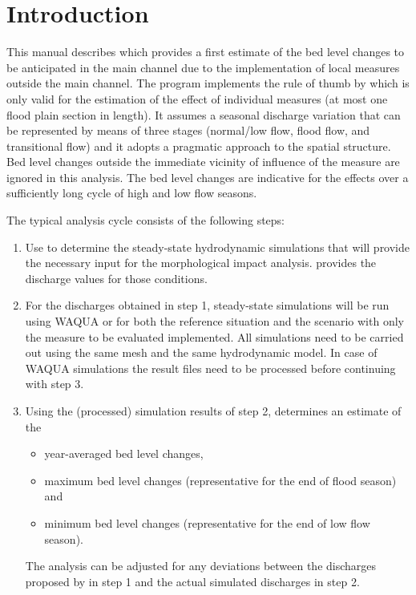 \chapter{Introduction}

This manual describes \dfastmi which provides a first estimate of the bed level changes to be anticipated in the main channel due to the implementation of local measures outside the main channel.
The program implements the rule of thumb by \citep{Sieben2008} which is only valid for the estimation of the effect of individual measures (at most one flood plain section in length).
It assumes a seasonal discharge variation that can be represented by means of three stages (normal/low flow, flood flow, and transitional flow) and it adopts a pragmatic approach to the spatial structure.
Bed level changes outside the immediate vicinity of influence of the measure are ignored in this analysis.
The bed level changes are indicative for the effects over a sufficiently long cycle of high and low flow seasons.

The typical analysis cycle consists of the following steps:

\begin{enumerate}
\item Use \dfastmi to determine the steady-state hydrodynamic simulations that will provide the necessary input for the morphological impact analysis.
\dfastmi provides the discharge values for those conditions.

\item For the discharges obtained in step 1, steady-state simulations will be run using WAQUA or \dflowfm for both the reference situation and the scenario with only the measure to be evaluated implemented.
All simulations need to be carried out using the same mesh and the same hydrodynamic model.
In case of WAQUA simulations the result files need to be processed before continuing with step 3.

\item Using the (processed) simulation results of step 2, \dfastmi determines an estimate of the
\begin{itemize}
\item year-averaged bed level changes,
\item maximum bed level changes (representative for the end of flood season) and
\item minimum bed level changes (representative for the end of low flow season).
\end{itemize}
The \dfastmi analysis can be adjusted for any deviations between the discharges proposed by \dfastmi in step 1 and the actual simulated discharges in step 2.
\end{enumerate}

